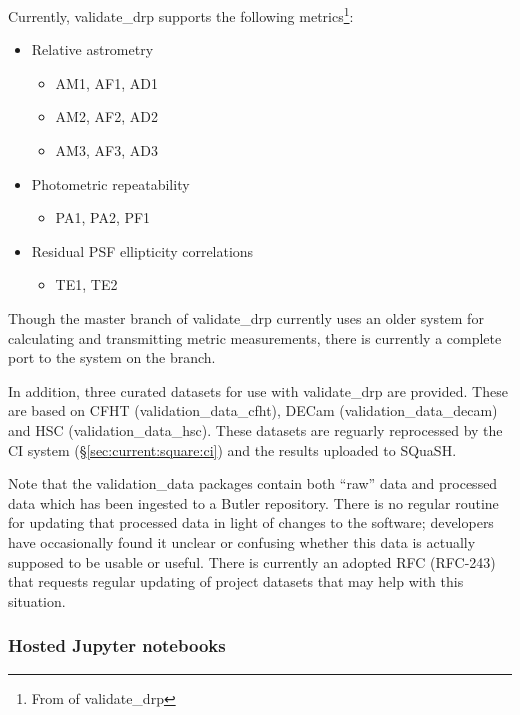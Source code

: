 \documentclass[DM,authoryear,toc,lsstdraft]{lsstdoc}
\begin{document}
Currently, validate\_drp supports the following metrics\footnote{From
 of validate\_drp }:

\begin{itemize}
\item{Relative astrometry
  \begin{itemize}
    \item{AM1, AF1, AD1}
    \item{AM2, AF2, AD2}
    \item{AM3, AF3, AD3}
  \end{itemize}
}
\item{Photometric repeatability
  \begin{itemize}
    \item{PA1, PA2, PF1}
  \end{itemize}
}
\item{Residual PSF ellipticity correlations
  \begin{itemize}
    \item{TE1, TE2}
  \end{itemize}
}
\end{itemize}

Though the master branch of validate\_drp currently uses an older system for
calculating and transmitting metric measurements, there is currently a complete
port to the  system on the  branch.

In addition, three curated datasets for use with validate\_drp are provided.
These are based on CFHT (validation\_data\_cfht), DECam
(validation\_data\_decam) and HSC (validation\_data\_hsc). These datasets are
reguarly reprocessed by the CI system (\S\ref{sec:current:square:ci}) and the
results uploaded to SQuaSH.

Note that the validation\_data packages contain both ``raw'' data and
processed data which has been ingested to a Butler repository. There is no
regular routine for updating that processed data in light of changes to the
software; developers have occasionally found it unclear or confusing whether
this data is actually supposed to be usable or useful. There is currently an
adopted RFC (RFC-243) that requests regular updating of project datasets that
may help with this situation.

\subsubsection{Hosted Jupyter notebooks}
\label{sec:current:square:jl}
\end{document}

